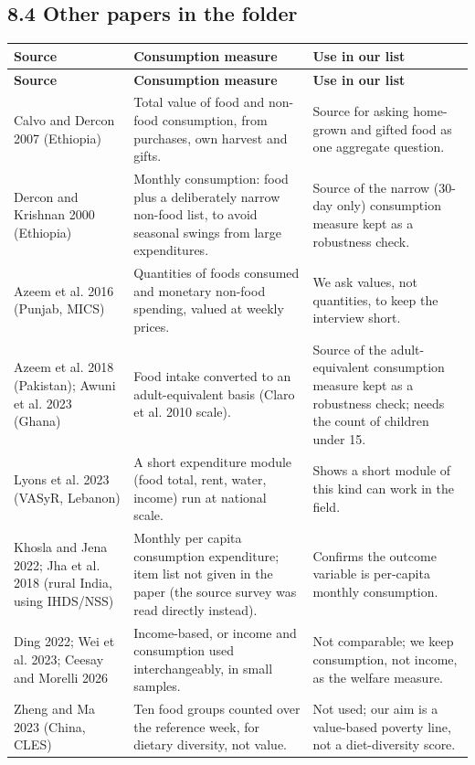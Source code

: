 \documentclass[10pt]{article}
\begin{document}
\subsection*{8.4 Other papers in the folder}
{\scriptsize
\begin{longtable}{p{3.6cm}p{7.6cm}p{5.1cm}}
\toprule
\textbf{Source} & \textbf{Consumption measure} & \textbf{Use in our list} \\
\midrule
\endfirsthead
\toprule
\textbf{Source} & \textbf{Consumption measure} & \textbf{Use in our list} \\
\midrule
\endhead
Calvo and Dercon 2007 (Ethiopia) & Total value of food and non-food consumption, from purchases, own harvest and gifts. & Source for asking home-grown and gifted food as one aggregate question. \\
Dercon and Krishnan 2000 (Ethiopia) & Monthly consumption: food plus a deliberately narrow non-food list, to avoid seasonal swings from large expenditures. & Source of the narrow (30-day only) consumption measure kept as a robustness check. \\
Azeem et al. 2016 (Punjab, MICS) & Quantities of foods consumed and monetary non-food spending, valued at weekly prices. & We ask values, not quantities, to keep the interview short. \\
Azeem et al. 2018 (Pakistan); Awuni et al. 2023 (Ghana) & Food intake converted to an adult-equivalent basis (Claro et al. 2010 scale). & Source of the adult-equivalent consumption measure kept as a robustness check; needs the count of children under 15. \\
Lyons et al. 2023 (VASyR, Lebanon) & A short expenditure module (food total, rent, water, income) run at national scale. & Shows a short module of this kind can work in the field. \\
Khosla and Jena 2022; Jha et al. 2018 (rural India, using IHDS/NSS) & Monthly per capita consumption expenditure; item list not given in the paper (the source survey was read directly instead). & Confirms the outcome variable is per-capita monthly consumption. \\
Ding 2022; Wei et al. 2023; Ceesay and Morelli 2026 & Income-based, or income and consumption used interchangeably, in small samples. & Not comparable; we keep consumption, not income, as the welfare measure. \\
Zheng and Ma 2023 (China, CLES) & Ten food groups counted over the reference week, for dietary diversity, not value. & Not used; our aim is a value-based poverty line, not a diet-diversity score. \\
\bottomrule
\end{longtable}
}
\end{document}

